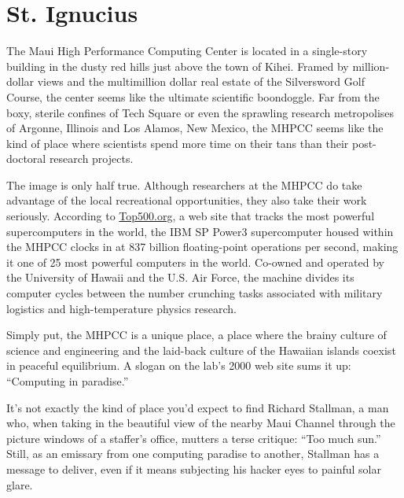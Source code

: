 
\chapter{St. Ignucius}

The Maui High Performance Computing Center is located in a single-story building in the dusty red hills just above the town of Kihei. Framed by million-dollar views and the multimillion dollar real estate of the Silversword Golf Course, the center seems like the ultimate scientific boondoggle. Far from the boxy, sterile confines of Tech Square or even the sprawling research metropolises of Argonne, Illinois and Los Alamos, New Mexico, the MHPCC seems like the kind of place where scientists spend more time on their tans than their post-doctoral research projects.

The image is only half true. Although researchers at the MHPCC do take advantage of the local recreational opportunities, they also take their work seriously. According to \url{Top500.org}, a web site that tracks the most powerful supercomputers in the world, the IBM SP Power3 supercomputer housed within the MHPCC clocks in at 837 billion floating-point operations per second, making it one of 25 most powerful computers in the world. Co-owned and operated by the University of Hawaii and the U.S. Air Force, the machine divides its computer cycles between the number crunching tasks associated with military logistics and high-temperature physics research.

Simply put, the MHPCC is a unique place, a place where the brainy culture of science and engineering and the laid-back culture of the Hawaiian islands coexist in peaceful equilibrium. A slogan on the lab's 2000 web site sums it up: ``Computing in paradise.''

It's not exactly the kind of place you'd expect to find Richard Stallman, a man who, when taking in the beautiful view of the nearby Maui Channel through the picture windows of a staffer's office, mutters a terse critique: ``Too much sun.'' Still, as an emissary from one computing paradise to another, Stallman has a message to deliver, even if it means subjecting his hacker eyes to painful solar glare.

